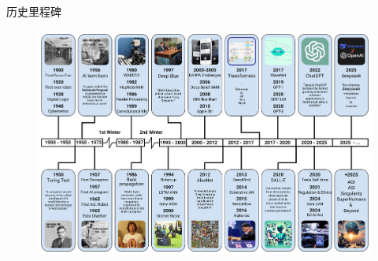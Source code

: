 \begin{frame}{历史里程碑}
%
\begin{figure}[h!]
\vspace*{-0.10in}
\centering
   \includegraphics[width=\textwidth]{Figures/AI-History_timeline.jpg}
\label{AI-History}
\end{figure}
\end{frame}

